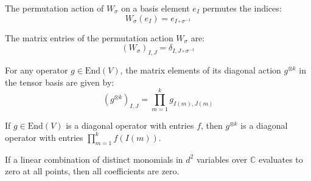 \begin{lemma}\label{lem:permAction_tensorBasis}
  \leanok
  The permutation action of $W_\sigma$ on a basis element $e_I$ permutes the indices:
  \begin{equation}
    W_\sigma(e_I) = e_{I \circ \sigma^{-1}}
  \end{equation}
\end{lemma}

\begin{lemma}\label{lem:toEndMatrix_permAction}
  \leanok
  The matrix entries of the permutation action $W_\sigma$ are:
  \begin{equation}
    (W_\sigma)_{I, J} = \delta_{I, J \circ \sigma^{-1}}
  \end{equation}
\end{lemma}

\begin{lemma}\label{lem:toEndMatrix_diagAction}
  \leanok
  For any operator $g \in \text{End}(V)$, the matrix elements of its diagonal action $g^{\otimes k}$ in the tensor basis are given by:
  \begin{equation}
    (g^{\otimes k})_{I, J} = \prod_{m=1}^k g_{I(m), J(m)}
  \end{equation}
\end{lemma}

\begin{lemma}\label{lem:diagAction_diagonal}
  \leanok
  If $g \in \text{End}(V)$ is a diagonal operator with entries $f$, then $g^{\otimes k}$ is a diagonal operator with entries $\prod_{m=1}^k f(I(m))$.
\end{lemma}

\begin{lemma}\label{lem:monomial_coeff_zero_of_eval_zero}
  \leanok
  If a linear combination of distinct monomials in $d^2$ variables over $\mathbb{C}$ evaluates to zero at all points, then all coefficients are zero.
\end{lemma}

